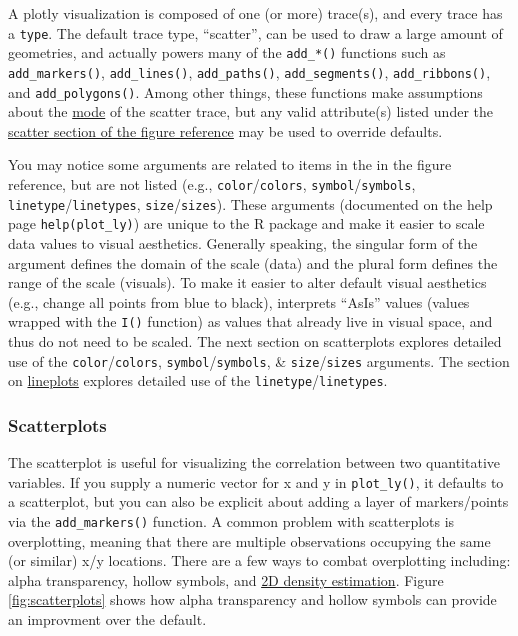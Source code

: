 \documentclass[12pt,]{isuthesis}
\begin{document}
A plotly visualization is composed of one (or more) trace(s), and every
trace has a \texttt{type}. The default trace type, ``scatter'', can be
used to draw a large amount of geometries, and actually powers many of
the \texttt{add\_*()} functions such as \texttt{add\_markers()},
\texttt{add\_lines()}, \texttt{add\_paths()}, \texttt{add\_segments()},
\texttt{add\_ribbons()}, and \texttt{add\_polygons()}. Among other
things, these functions make assumptions about the
\href{https://plot.ly/r/reference/\#scatter-mode}{mode} of the scatter
trace, but any valid attribute(s) listed under the
\href{https://plot.ly/r/reference/\#scatter}{scatter section of the
figure reference} may be used to override defaults.

You may notice some arguments are related to items in the in the figure
reference, but are not listed (e.g., \texttt{color}/\texttt{colors},
\texttt{symbol}/\texttt{symbols}, \texttt{linetype}/\texttt{linetypes},
\texttt{size}/\texttt{sizes}). These arguments (documented on the help
page \texttt{help(plot\_ly)}) are unique to the R package and make it
easier to scale data values to visual aesthetics. Generally speaking,
the singular form of the argument defines the domain of the scale (data)
and the plural form defines the range of the scale (visuals). To make it
easier to alter default visual aesthetics (e.g., change all points from
blue to black), interprets ``AsIs'' values (values wrapped with the
\texttt{I()} function) as values that already live in visual space, and
thus do not need to be scaled. The next section on scatterplots explores
detailed use of the \texttt{color}/\texttt{colors},
\texttt{symbol}/\texttt{symbols}, \& \texttt{size}/\texttt{sizes}
arguments. The section on \protect\hyperlink{line-plots}{lineplots}
explores detailed use of the \texttt{linetype}/\texttt{linetypes}.

\hypertarget{scatterplots}{\subsubsection{Scatterplots}\label{scatterplots}}

The scatterplot is useful for visualizing the correlation between two
quantitative variables. If you supply a numeric vector for x and y in
\texttt{plot\_ly()}, it defaults to a scatterplot, but you can also be
explicit about adding a layer of markers/points via the
\texttt{add\_markers()} function. A common problem with scatterplots is
overplotting, meaning that there are multiple observations occupying the
same (or similar) x/y locations. There are a few ways to combat
overplotting including: alpha transparency, hollow symbols, and
\protect\hyperlink{rectangular-binning-in-R}{2D density estimation}.
Figure \ref{fig:scatterplots} shows how alpha transparency and hollow
symbols can provide an improvment over the default.
\end{document}
